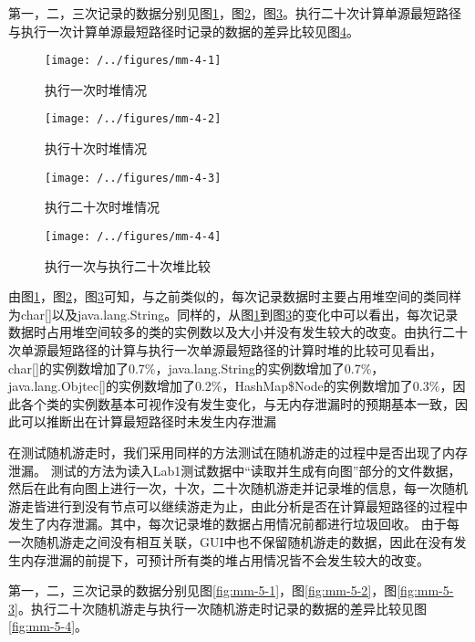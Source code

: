 第一，二，三次记录的数据分别见图\ref{fig:mm-4-1}，图\ref{fig:mm-4-2}，图\ref{fig:mm-4-3}。执行二十次计算单源最短路径与执行一次计算单源最短路径时记录的数据的差异比较见图\ref{fig:mm-4-4}。

\begin{figure}
\centering
\texttt{[image: /../figures/mm-4-1]}
\caption{执行一次时堆情况}
\label{fig:mm-4-1}
\end{figure}

\begin{figure}
\centering
\texttt{[image: /../figures/mm-4-2]}
\caption{执行十次时堆情况}
\label{fig:mm-4-2}
\end{figure}

\begin{figure}
\centering
\texttt{[image: /../figures/mm-4-3]}
\caption{执行二十次时堆情况}
\label{fig:mm-4-3}
\end{figure}

\begin{figure}
\centering
\texttt{[image: /../figures/mm-4-4]}
\caption{执行一次与执行二十次堆比较}
\label{fig:mm-4-4}
\end{figure}

由图\ref{fig:mm-4-1}，图\ref{fig:mm-4-2}，图\ref{fig:mm-4-3}可知，与之前类似的，每次记录数据时主要占用堆空间的类同样为char[]以及java.lang.String。同样的，从图\ref{fig:mm-4-1}到图\ref{fig:mm-4-3}的变化中可以看出，每次记录数据时占用堆空间较多的类的实例数以及大小并没有发生较大的改变。由执行二十次单源最短路径的计算与执行一次单源最短路径的计算时堆的比较可见看出，char[]的实例数增加了0.7\%，java.lang.String的实例数增加了0.7\%，java.lang.Objtec[]的实例数增加了0.2\%，HashMap\$Node的实例数增加了0.3\%，因此各个类的实例数基本可视作没有发生变化，与无内存泄漏时的预期基本一致，因此可以推断出在计算最短路径时未发生内存泄漏

在测试随机游走时，我们采用同样的方法测试在随机游走的过程中是否出现了内存泄漏。
测试的方法为读入Lab1测试数据中“读取并生成有向图”部分的文件数据，然后在此有向图上进行一次，十次，二十次随机游走并记录堆的信息，每一次随机游走皆进行到没有节点可以继续游走为止，由此分析是否在计算最短路径的过程中发生了内存泄漏。其中，每次记录堆的数据占用情况前都进行垃圾回收。
由于每一次随机游走之间没有相互关联，GUI中也不保留随机游走的数据，因此在没有发生内存泄漏的前提下，可预计所有类的堆占用情况皆不会发生较大的改变。

第一，二，三次记录的数据分别见图\ref{fig:mm-5-1}，图\ref{fig:mm-5-2}，图\ref{fig:mm-5-3}。执行二十次随机游走与执行一次随机游走时记录的数据的差异比较见图\ref{fig:mm-5-4}。

